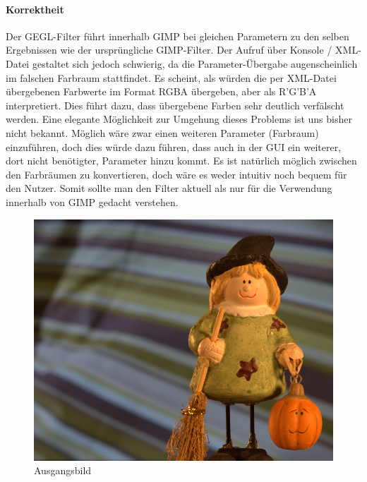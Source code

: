 \documentclass[10pt,a4paper]{article}
\begin{document}
\paragraph{Korrektheit}
Der GEGL-Filter führt innerhalb GIMP bei gleichen Parametern zu den selben Ergebnissen wie der ursprüngliche GIMP-Filter. Der Aufruf über Konsole / XML-Datei gestaltet sich jedoch schwierig, da die Parameter-Übergabe augenscheinlich im falschen Farbraum stattfindet. Es scheint, als würden die per XML-Datei übergebenen Farbwerte im Format RGBA übergeben, aber als R'G'B'A interpretiert. Dies führt dazu, dass übergebene Farben sehr deutlich verfälscht werden. Eine elegante Möglichkeit zur Umgehung dieses Problems ist uns bisher nicht bekannt. Möglich wäre zwar einen weiteren Parameter (Farbraum) einzuführen, doch dies würde dazu führen, dass auch in der GUI ein weiterer, dort nicht benötigter, Parameter hinzu kommt. Es ist natürlich möglich zwischen den Farbräumen zu konvertieren, doch wäre es weder intuitiv noch bequem für den Nutzer. Somit sollte man den Filter aktuell als nur für die Verwendung innerhalb von GIMP gedacht verstehen.
\begin{figure}[H]
\centering
\includegraphics[scale=0.4]{img/matting-global.png}
\caption{Ausgangsbild}
\label{fig:CE_aus}
\end{figure}
\end{document}
